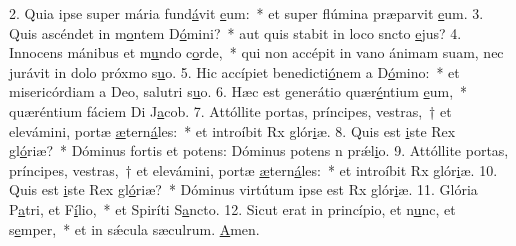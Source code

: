 2. Quia ipse super mária fund\uline{á}vit \uline{e}um:~* et super flúmina præparvit \uline{e}um.
3. Quis ascéndet in m\uline{o}ntem D\uline{ó}mini?~* aut quis stabit in loco sncto \uline{e}jus?
4. Innocens mánibus et m\uline{u}ndo c\uline{o}rde,~* qui non accépit in vano ánimam suam, nec jurávit in dolo próxmo s\uline{u}o.
5. Hic accípiet benedicti\uline{ó}nem a D\uline{ó}mino:~* et misericórdiam a Deo, salutri s\uline{u}o.
6. Hæc est generátio quær\uline{é}ntium \uline{e}um,~* quæréntium fáciem Di J\uline{a}cob.
7. Attóllite portas, príncipes, vestras,~† et elevámini, portæ \uline{æ}tern\uline{á}les:~* et introíbit Rx glór\uline{i}æ.
8. Quis est \uline{i}ste Rex gl\uline{ó}riæ?~* Dóminus fortis et potens: Dóminus potens n prǽl\uline{i}o.
9. Attóllite portas, príncipes, vestras,~† et elevámini, portæ \uline{æ}tern\uline{á}les:~* et introíbit Rx glór\uline{i}æ.
10. Quis est \uline{i}ste Rex gl\uline{ó}riæ?~* Dóminus virtútum ipse est Rx glór\uline{i}æ.
11. Glória P\uline{a}tri, et F\uline{í}lio,~* et Spiríti S\uline{a}ncto.
12. Sicut erat in princípio, et n\uline{u}nc, et s\uline{e}mper,~* et in sǽcula sæculrum. \uline{A}men.
